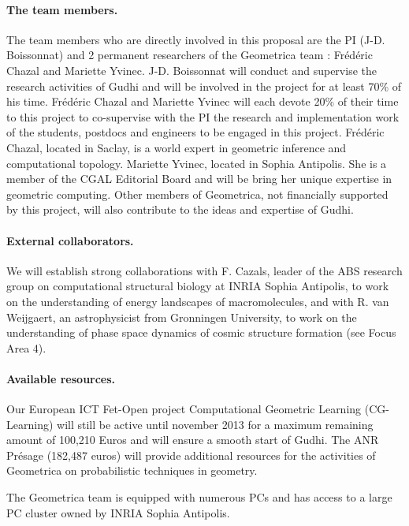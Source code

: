 \paragraph{The team members.}
The team members who are directly involved in this proposal are the PI (J-D. Boissonnat) and 2 permanent researchers of the Geometrica team : Fr\'ed\'eric Chazal and Mariette Yvinec.  J-D. Boissonnat will conduct and supervise the research activities of Gudhi and will be involved in the project for at least 70\% of his time.  Fr\'ed\'eric Chazal and Mariette Yvinec will each devote 20\% of their time to this project to co-supervise with the PI the research and implementation work of the students, postdocs and engineers to be engaged in this project. Fr\'ed\'eric Chazal, located in Saclay,  is a world expert in geometric inference and computational topology. Mariette Yvinec, located in Sophia Antipolis. She is a member of the CGAL Editorial Board and will be bring her unique expertise in geometric computing. Other members of Geometrica, not financially supported by this project, will also contribute to the ideas and expertise of Gudhi.

\paragraph{External collaborators.} We will establish  strong collaborations with F. Cazals, leader of the ABS research group on computational structural biology at INRIA Sophia Antipolis, to work on the understanding of energy landscapes of macromolecules,  and with R. van Weijgaert, an astrophysicist from Gronningen University, to work on the understanding of phase space dynamics of cosmic structure formation (see Focus Area 4).

\paragraph{Available resources.} Our European ICT Fet-Open project Computational Geometric Learning (CG-Learning) will still be active until november 2013 for a maximum remaining amount of 100,210 Euros and will ensure a smooth start of Gudhi.  The ANR Pr\'esage (182,487 euros) will provide additional resources for the activities of Geometrica on probabilistic techniques in geometry.

The Geometrica team is equipped with numerous PCs and has access to a large PC cluster owned by INRIA Sophia Antipolis.

